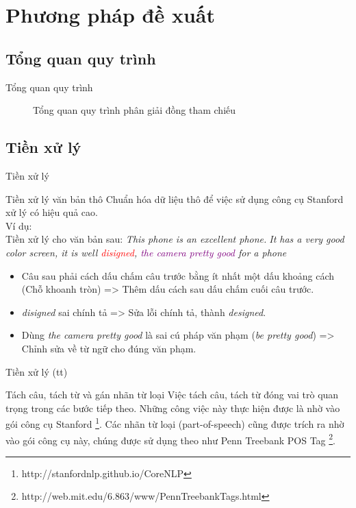 \documentclass{beamer}
\begin{document}
	\section{Phương pháp đề xuất}
	\subsection{Tổng quan quy trình}
	\begin{frame}{Tổng quan quy trình}		
		\begin{figure}[H] 
			\centering				
			\resizebox{90mm}{!}{}
			\caption{Tổng quan quy trình phân giải đồng tham chiếu}	
			\label{fig:generalmodel}						
		\end{figure}
	\end{frame}	

	\subsection{Tiền xử lý}	
	\begin{frame}{Tiền xử lý}		
		\begin{block}{Tiền xử lý văn bản thô}
			Chuẩn hóa dữ liệu thô để việc sử dụng công cụ Stanford xử lý có hiệu quả cao.
			\\Ví dụ: 
			\\Tiền xử lý cho văn bản sau: \textit{This phone is an excellent phone\textcircled{.}It has a very good color screen, it is well \textcolor{red}{disigned}, \textcolor{purple}{the camera pretty good} for a phone}
			\begin{itemize}
				\item{Câu sau phải cách dấu chấm câu trước bằng ít nhất một dấu khoảng cách (Chỗ khoanh tròn) => Thêm dấu cách sau dấu chấm cuối câu trước.}
				\item{\textit{disigned} sai chính tả => Sửa lỗi chính tả, thành \textit{designed}.}
				\item{Dùng \textit{the camera pretty good} là sai cú pháp văn phạm (\textit{be pretty good}) => Chỉnh sửa về từ ngữ cho đúng văn phạm.}
			\end{itemize}
		\end{block}
	\end{frame}

	\begin{frame}{Tiền xử lý (tt)}
		\begin{block}{Tách câu, tách từ và gán nhãn từ loại}
			Việc tách câu, tách từ đóng vai trò quan trọng trong các bước tiếp theo. Những công việc này thực hiện được là nhờ vào gói công cụ Stanford \footnote{http://stanfordnlp.github.io/CoreNLP}. Các nhãn từ loại (part-of-speech) cũng được trích ra nhờ vào gói công cụ này, chúng được sử dụng theo như Penn Treebank POS Tag \footnote{http://web.mit.edu/6.863/www/PennTreebankTags.html}.
		\end{block}
	\end{frame}	
\end{document}
